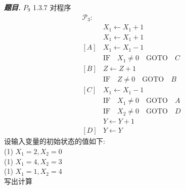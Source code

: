 \documentclass[10pt, a4paper, oneside]{ctexart}
\newenvironment{problem}{\begin{framed}\par\noindent\textbf{\textit{题目. }}}{\end{framed}\par}
\begin{document}
    \begin{problem}
    $P_9$ 1.3.7 对程序
    \begin{align*}
        \mathscr{P}_3:& \\
        &X_1\leftarrow X_1+1\\
        &X_1\leftarrow X_1+1\\
        [A]&X_1 \leftarrow X_1-1\\
        &\text{IF}\quad X_1\neq 0 \quad\text{GOTO}\quad C\\
        [B]& Z\leftarrow Z+1\\
        &\text{IF}\quad Z\neq 0\quad \text{GOTO}\quad B\\
        [C]& X_1\leftarrow X_1-1\\
        &\text{IF}\quad X_1\neq 0\quad \text{GOTO}\quad A\\
        &\text{IF}\quad X_2\neq 0\quad \text{GOTO}\quad D\\
        &Y\leftarrow Y+1\\
        [D]& Y\leftarrow Y
    \end{align*}
    设输入变量的初始状态的值如下: \\
    (1) $X_1=2, X_2=0$\\
    (1) $X_1=4, X_2=3$\\
    (1) $X_1=1, X_2=4$\\
    写出计算
    \end{problem}
\end{document}
